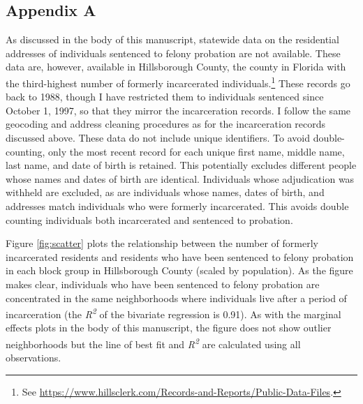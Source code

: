 \documentclass[
  12pt,
]{article}
\begin{document}
\newpage
{}

\hypertarget{appendix-a}{%
\subsection*{Appendix A}\label{appendix-a}}

As discussed in the body of this manuscript, statewide data on the residential addresses of individuals sentenced to felony probation are not available. These data are, however, available in Hillsborough County, the county in Florida with the third-highest number of formerly incarcerated individuals.\footnote{See \url{https://www.hillsclerk.com/Records-and-Reports/Public-Data-Files}.} These records go back to 1988, though I have restricted them to individuals sentenced since October 1, 1997, so that they mirror the incarceration records. I follow the same geocoding and address cleaning procedures as for the incarceration records discussed above. These data do not include unique identifiers. To avoid double-counting, only the most recent record for each unique first name, middle name, last name, and date of birth is retained. This potentially excludes different people whose names and dates of birth are identical. Individuals whose adjudication was withheld are excluded, as are individuals whose names, dates of birth, and addresses match individuals who were formerly incarcerated. This avoids double counting individuals both incarcerated and sentenced to probation.

Figure \ref{fig:scatter} plots the relationship between the number of formerly incarcerated residents and residents who have been sentenced to felony probation in each block group in Hillsborough County (scaled by population). As the figure makes clear, individuals who have been sentenced to felony probation are concentrated in the same neighborhoods where individuals live after a period of incarceration (the \emph{R\textsuperscript{2}} of the bivariate regression is 0.91). As with the marginal effects plots in the body of this manuscript, the figure does not show outlier neighborhoods but the line of best fit and \emph{R\textsuperscript{2}} are calculated using all observations.
\end{document}
